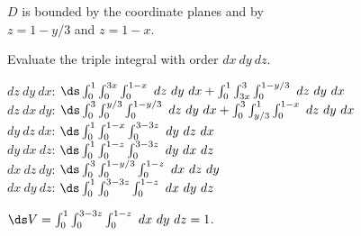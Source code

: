 {$D$ is bounded by the coordinate planes and by \\
$z=1-y/3$ and $z=1-x$.

Evaluate the triple integral with order $dx\ dy\ dz$.

}
{$dz\ dy\ dx$: $\ds\int_{0}^1\int_{0}^{3x}\int_{0}^{1-x}\ dz\ dy\ dx+\int_{0}^1\int_{3x}^{3}\int_{0}^{1-y/3}\ dz\ dy\ dx$\\
	$dz\ dx\ dy$: $\ds\int_{0}^3\int_{0}^{y/3}\int_{0}^{1-y/3}\ dz\ dy\ dx+\int_{0}^3\int_{y/3}^{1}\int_{0}^{1-x}\ dz\ dy\ dx$\\
	$dy\ dz\ dx$: $\ds\int_{0}^1\int_0^{1-x}\int_{0}^{3-3z}\ dy\ dz\ dx $\\
	$dy\ dx\ dz$: $\ds\int_0^1\int_{0}^{1-z}\int_{0}^{3-3z}\ dy\ dx\ dz$\\
	$dx\ dz\ dy$: $\ds\int_{0}^3\int_{0}^{1-y/3}\int_{0}^{1-z}\ dx\ dz\ dy$\\
	$dx\ dy\ dz$: $\ds\int_0^1\int_{0}^{3-3z}\int_{0}^{1-z}\ dx\ dy\ dz$
	
	$\ds V = \int_0^1\int_{0}^{3-3z}\int_{0}^{1-z}\ dx\ dy\ dz = 1$.
}
